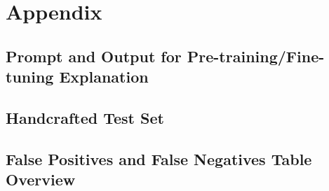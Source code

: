 \chapter*{Appendix}

\section{Prompt and Output for Pre-training/Fine-tuning Explanation}
\label{tab:prompt_pdf}


\section{Handcrafted Test Set}
\label{tab:handcrafted_testset}




\section{False Positives and False Negatives Table Overview}
\label{tab:fp_fn_table}

